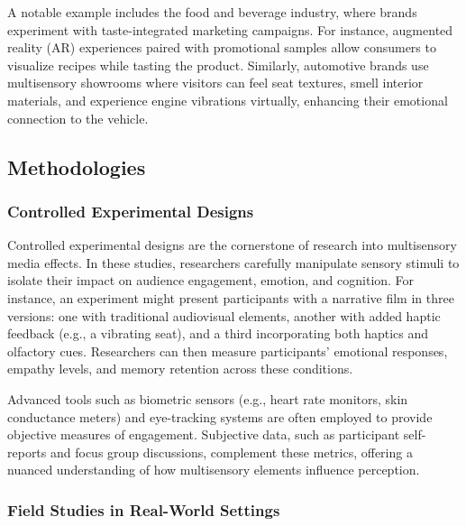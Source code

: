 \documentclass[
]{book}
\begin{document}
A notable example includes the food and beverage industry, where brands experiment with taste-integrated marketing campaigns. For instance, augmented reality (AR) experiences paired with promotional samples allow consumers to visualize recipes while tasting the product. Similarly, automotive brands use multisensory showrooms where visitors can feel seat textures, smell interior materials, and experience engine vibrations virtually, enhancing their emotional connection to the vehicle.

\subsection*{Methodologies}\label{methodologies}

\subsubsection*{Controlled Experimental Designs}\label{controlled-experimental-designs}

Controlled experimental designs are the cornerstone of research into multisensory media effects. In these studies, researchers carefully manipulate sensory stimuli to isolate their impact on audience engagement, emotion, and cognition. For instance, an experiment might present participants with a narrative film in three versions: one with traditional audiovisual elements, another with added haptic feedback (e.g., a vibrating seat), and a third incorporating both haptics and olfactory cues. Researchers can then measure participants' emotional responses, empathy levels, and memory retention across these conditions.

Advanced tools such as biometric sensors (e.g., heart rate monitors, skin conductance meters) and eye-tracking systems are often employed to provide objective measures of engagement. Subjective data, such as participant self-reports and focus group discussions, complement these metrics, offering a nuanced understanding of how multisensory elements influence perception.

\subsubsection*{Field Studies in Real-World Settings}\label{field-studies-in-real-world-settings}
\end{document}
